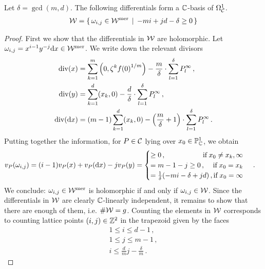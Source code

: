 \documentclass[main.tex]{subfiles}
\begin{document}
   \bigskip
   
     \begin{prop}\label{prop:holom_diff}
	Let $\delta = \gcd(m,d)$. The following differentials form  a $\mathbb{C}$-basis of $\Omega^1_{\mathcal{C}}$.
	\begin{align}\label{eq:holm_diff}
	  \mathcal{W} =  \left\{ \, \omega_{i,j} \in \mathcal{W}^{\text{mer}} \, \mid \, -mi + jd - \delta \ge 0 \, \right\}
	\end{align}
     \end{prop}
     \begin{proof}
      First we show that the differentials in $\mathcal{W}$ are holomorphic.
      Let $\omega_{i,j} = x^{i-1}y^{-j} \mathrm d x \in \mathcal{W}^{\text{mer}}$. We write down the relevant divisors
      \begin{align*}
       \operatorname{div}(x) & = \sum_{k=1}^m \left(0,\zeta^k{f(0)}^{1/m}\right) - \frac{m}{\delta} \cdot \sum_{l = 1}^{\delta} P^{\infty}_l\,, \\
       \operatorname{div}(y) & = \sum_{k = 1}^d (x_k,0) - \frac{d}{\delta} \cdot \sum_{l = 1}^{\delta}  P^{\infty}_l\,, \\
       \operatorname{div}(\mathrm d x) & = (m-1)\sum_{k = 1}^d (x_k,0) - \left(\frac{m}{\delta} + 1\right)\cdot \sum_{l = 1}^{\delta}  P^{\infty}_l\,.
      \end{align*}
     Putting together the information, for $P \in \mathcal{C}$ lying over $x_0 \in \mathbb{P}^1_{\mathbb{C}}$, we obtain
     \begin{align}\label{eq:diff_cases}
      v_P(\omega_{i,j}) & = (i-1) v_P(x) + v_P(\dx)  - j v_P(y) = 
	\begin{cases}
	 \ge 0\,, \hfill \text{if} \; x_0 \ne x_k,\infty \\
	 = m-1-j \ge 0 \,, \hfill \text{if} \; x_0 = x_k \\
	 = \frac{1}{\delta}(-mi-\delta+jd)\,,\hfill \text{if} \; x_0 = \infty
	\end{cases}\,.
     \end{align}
     We conclude: $\omega_{i,j} \in \mathcal{W}^{\text{mer}}$ is holomorphic if and only if $\omega_{i,j} \in \mathcal{W}$. \abstand
     Since the differentials in $\mathcal{W}$ are clearly $\mathbb{C}$-linearly independent, it remains to show that
     there are enough of them, i.e. $\#\mathcal{W} = g$. \abstand
     Counting the elements in $\mathcal{W}$ corresponds to counting lattice points $(i,j) \in \mathbb{Z}^2$ in the trapezoid given by the faces
     \begin{align*}
	1 \le i \le d-1\,,\\
	1 \le j \le m-1\,, \\
	i \le \frac{d}{m}j - \frac{\delta}{m}\,.
     \end{align*}

\end{proof}
\end{document}
